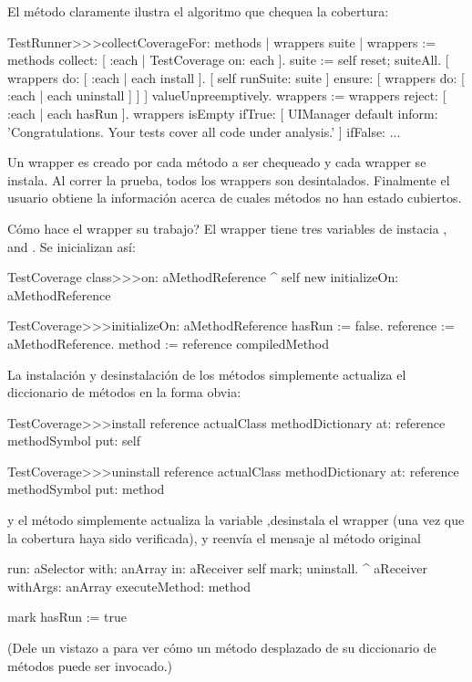 \documentclass[a4paper,10pt,twoside]{book}
\begin{document}
El m\'etodo  claramente ilustra el algoritmo que chequea la cobertura:
\begin{code}{}
TestRunner>>>collectCoverageFor: methods
        | wrappers suite |
        wrappers := methods collect: [ :each | TestCoverage on: each ].
        suite := self
                reset;
                suiteAll.
        [ wrappers do: [ :each | each install ].
          [ self runSuite: suite ] ensure: [ wrappers do: [ :each | each uninstall ] ] ] valueUnpreemptively.
        wrappers := wrappers reject: [ :each | each hasRun ].
        wrappers isEmpty
                ifTrue:
                        [ UIManager default inform: 'Congratulations. Your tests cover all code under analysis.' ]
                ifFalse: ...
\end{code}
Un wrapper es creado por cada m\'etodo a ser chequeado y cada wrapper se instala. Al correr la prueba, todos los wrappers son desintalados. Finalmente el usuario obtiene la informaci\'on acerca de cuales m\'etodos no han estado cubiertos.

C\'omo hace el wrapper su trabajo? El wrapper  tiene tres variables de instacia ,  and .
Se inicializan as\'i:
\begin{code}{}
TestCoverage class>>>on: aMethodReference
        ^ self new initializeOn: aMethodReference

TestCoverage>>>initializeOn: aMethodReference
        hasRun := false.
        reference := aMethodReference.
        method := reference compiledMethod
\end{code}

La instalaci\'on y desinstalaci\'on de los m\'etodos simplemente actualiza el diccionario de m\'etodos en la forma obvia:
\begin{code}{}
TestCoverage>>>install
        reference actualClass methodDictionary
                at: reference methodSymbol
                put: self

TestCoverage>>>uninstall
        reference actualClass methodDictionary
                at: reference methodSymbol
                put: method
\end{code}
\noindent
y el m\'etodo  simplemente actualiza la variable  ,desinstala el wrapper (una vez que la cobertura haya sido verificada), y reenv\'ia el mensaje al m\'etodo original
\begin{code}{}
run: aSelector with: anArray in: aReceiver
        self mark; uninstall.
        ^ aReceiver withArgs: anArray executeMethod: method

mark
        hasRun := true
\end{code}
(Dele un vistazo a  para ver c\'omo  un m\'etodo desplazado de su diccionario de m\'etodos puede ser invocado.)
\end{document}
